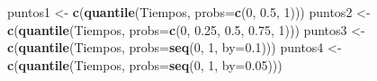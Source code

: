 \documentclass[10pt,]{krantz}
\makeatletter
\newenvironment{Shaded}{\begin{snugshade}}{\end{snugshade}}
\newcommand{\KeywordTok}[1]{\textcolor[rgb]{0.13,0.29,0.53}{\textbf{{#1}}}}
\newcommand{\DataTypeTok}[1]{\textcolor[rgb]{0.13,0.29,0.53}{{#1}}}
\newcommand{\DecValTok}[1]{\textcolor[rgb]{0.00,0.00,0.81}{{#1}}}
\newcommand{\FloatTok}[1]{\textcolor[rgb]{0.00,0.00,0.81}{{#1}}}
\newcommand{\StringTok}[1]{\textcolor[rgb]{0.31,0.60,0.02}{{#1}}}
\newcommand{\NormalTok}[1]{{#1}}
\newenvironment{kframe}{%
\medskip{}
\setlength{\fboxsep}{.8em}
 \def\at@end@of@kframe{}%
 \ifinner\ifhmode%
  \def\at@end@of@kframe{\end{minipage}}%
  \begin{minipage}{\columnwidth}%
 \fi\fi%
 \def\FrameCommand##1{\hskip\@totalleftmargin \hskip-\fboxsep
 \colorbox{shadecolor}{##1}\hskip-\fboxsep
     \hskip-\linewidth \hskip-\@totalleftmargin \hskip\columnwidth}%
 \MakeFramed {\advance\hsize-\width
   \@totalleftmargin\z@ \linewidth\hsize
   \@setminipage}}%
 {\par\unskip\endMakeFramed%
 \at@end@of@kframe}
\renewenvironment{Shaded}{\begin{kframe}}{\end{kframe}}
\makeatother
\begin{document}
\begin{Shaded}
\begin{Highlighting}[]
\NormalTok{puntos1 <-}\StringTok{ }\KeywordTok{c}\NormalTok{(}\KeywordTok{quantile}\NormalTok{(Tiempos, }\DataTypeTok{probs=}\KeywordTok{c}\NormalTok{(}\DecValTok{0}\NormalTok{, }\FloatTok{0.5}\NormalTok{, }\DecValTok{1}\NormalTok{)))}
\NormalTok{puntos2 <-}\StringTok{ }\KeywordTok{c}\NormalTok{(}\KeywordTok{quantile}\NormalTok{(Tiempos, }\DataTypeTok{probs=}\KeywordTok{c}\NormalTok{(}\DecValTok{0}\NormalTok{, }\FloatTok{0.25}\NormalTok{, }\FloatTok{0.5}\NormalTok{, }\FloatTok{0.75}\NormalTok{, }\DecValTok{1}\NormalTok{)))}
\NormalTok{puntos3 <-}\StringTok{ }\KeywordTok{c}\NormalTok{(}\KeywordTok{quantile}\NormalTok{(Tiempos, }\DataTypeTok{probs=}\KeywordTok{seq}\NormalTok{(}\DecValTok{0}\NormalTok{, }\DecValTok{1}\NormalTok{, }\DataTypeTok{by=}\FloatTok{0.1}\NormalTok{)))}
\NormalTok{puntos4 <-}\StringTok{ }\KeywordTok{c}\NormalTok{(}\KeywordTok{quantile}\NormalTok{(Tiempos, }\DataTypeTok{probs=}\KeywordTok{seq}\NormalTok{(}\DecValTok{0}\NormalTok{, }\DecValTok{1}\NormalTok{, }\DataTypeTok{by=}\FloatTok{0.05}\NormalTok{)))}


\end{Highlighting}
\end{Shaded}
\end{document}

